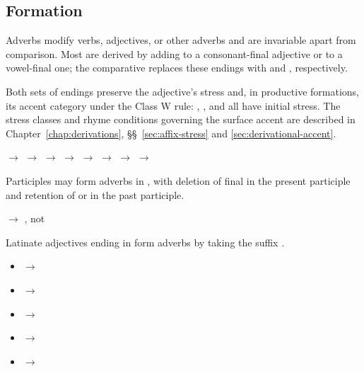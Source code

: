 \subsection{Formation}
\label{sec:adverb-formation}

Adverbs modify verbs, adjectives, or other adverbs and are invariable apart from comparison. Most are derived by adding  to a consonant-final adjective or  to a vowel-final one; the comparative replaces these endings with  and , respectively.

Both sets of endings preserve the adjective's stress and, in productive formations, its accent category under the Class W rule: , , and  all have initial stress. The stress classes and rhyme conditions governing the surface accent are described in Chapter~\ref{chap:derivations}, \S\S~\ref{sec:affix-stress} and \ref{sec:derivational-accent}.

\pex
\a {} $\rightarrow$  $\rightarrow$ 
\a {} $\rightarrow$  $\rightarrow$ 
\a {} $\rightarrow$  $\rightarrow$ 
\a {} $\rightarrow$  $\rightarrow$ 
\xe

Participles may form adverbs in , with deletion of final  in the present participle and retention of  or  in the past participle.

\pex
\a {} $\rightarrow$ , not 
\xe

Latinate adjectives ending in  form adverbs by taking the suffix .

\begin{itemize}
    \item {} $\rightarrow$ 
    \item {} $\rightarrow$ 
    \item {} $\rightarrow$ 
    \item {} $\rightarrow$ 
    \item {} $\rightarrow$ 
\end{itemize}

